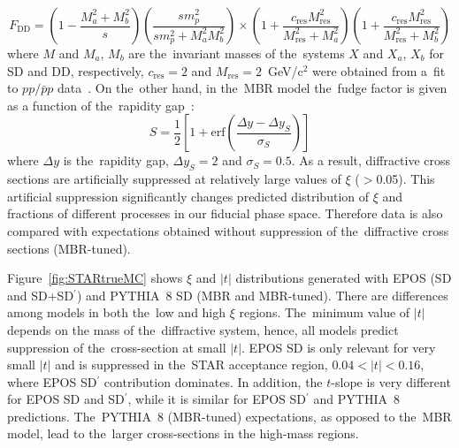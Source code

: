 \begin{equation}
F_{\textrm{DD}}=\left(1-\frac{M_a^2+M_b^2}{s}\right)\left(\frac{sm^2_p}{sm^2_p+M_a^2M_b^2}\right)\times
\left(1+\frac{c_\textrm{res}M_\textrm{res}^2}{M_\textrm{res}^2+M_a^2}\right)\left(1+\frac{c_\textrm{res}M_\textrm{res}^2}{M_\textrm{res}^2+M_b^2}\right)
\end{equation}
where $M$ and $M_{a}$, $M_{b}$ are the~invariant masses of the~systems $X$ and $X_a$, $X_b$ for SD and DD, respectively, $c_\textrm{res}=2$ and $M_\textrm{res}=2$~GeV/c$^2$ were obtained from a~fit to $pp/\bar{p}p$ data~\cite{Sjostrand:2006za}. On the~other hand, in the~\ac{MBR} model the~fudge factor is given as a function of the~rapidity gap~\cite{MBR:intro}:
\begin{equation}
S=\frac{1}{2}\left[1+\textrm{erf}\left(\frac{\Delta y-\Delta y_S}{\sigma_S}\right)\right]
\end{equation}
where $\Delta y$ is the~rapidity gap, $\Delta y_S=2$ and $\sigma_S=0.5$. As a result, diffractive cross sections are artificially suppressed at 
relatively large values of $\xi$ ($>$0.05). This artificial suppression significantly changes predicted distribution of $\xi$ and fractions of different processes in our fiducial phase space. Therefore data is also compared with expectations obtained without suppression of the~diffractive cross sections (MBR-tuned).

Figure~\ref{fig:STARtrueMC} shows $\xi$ and $|t|$ distributions generated with  EPOS (SD and SD+SD$^\prime$) and PYTHIA~8 SD (MBR and MBR-tuned). There are differences among models in both the~low and high $\xi$ regions. The~minimum value of $|t|$ depends on the mass of the~diffractive system, hence, all models predict suppression of the~cross-section at small $|t|$. EPOS SD is only relevant for very small $|t|$ and is suppressed in the~STAR acceptance region, $0.04<|t|<0.16$, where EPOS SD$^\prime$ contribution dominates. In addition, the $t$-slope is  very different for EPOS SD and SD$^\prime$, while it is similar for EPOS SD$^\prime$ and PYTHIA~8 predictions. The~PYTHIA~8 (MBR-tuned) expectations, as opposed to the~MBR model,  lead
to the~larger cross-sections in the high-mass regions.
 
